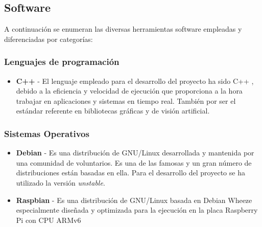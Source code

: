 \subsection{Software}
A continuación se enumeran las diversas herramientas software empleadas y diferenciadas por categorías:

\subsubsection{Lenguajes de programación}
\begin{itemize}
\item \textbf{C++} - El lenguaje empleado para el desarrollo del proyecto ha sido C++ \cite{Stroustrup00}, debido a la eficiencia y velocidad de ejecución que proporciona a la hora trabajar en aplicaciones y sistemas en tiempo real. También por ser el estándar referente en bibliotecas gráficas y de visión artificial.
\end{itemize}

\subsubsection{Sistemas Operativos}
\begin{itemize}
\item \textbf{Debian} - Es una distribución de GNU/Linux desarrollada y mantenida por una comunidad de voluntarios. Es una de las famosas y un gran número de distribuciones están basadas en ella. Para el desarrollo del proyecto se ha utilizado la versión \emph{unstable}. 

\item \textbf{Raspbian} - Es una distribución de GNU/Linux basada en Debian Wheeze especialmente diseñada y optimizada para la ejecución en la placa Raspberry Pi con  CPU ARMv6   
\end{itemize}

